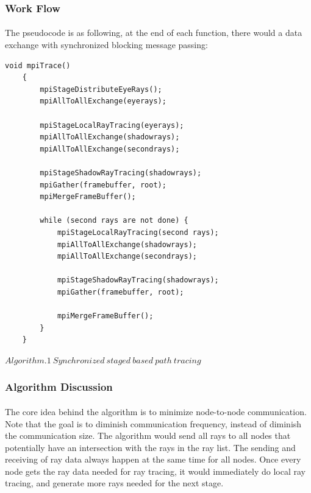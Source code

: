 \documentclass[a4paper, oneside, 10pt]{article}
\begin{document}
\subsubsection{Work Flow}
\paragraph{}The pseudocode is as following, at the end of each function, there would a data exchange with synchronized blocking message passing:
\lstset{language=c++}
\begin{lstlisting}[frame=single]
    void mpiTrace()
    {
        mpiStageDistributeEyeRays();
        mpiAllToAllExchange(eyerays);
        
        mpiStageLocalRayTracing(eyerays);
        mpiAllToAllExchange(shadowrays);
        mpiAllToAllExchange(secondrays);
        
        mpiStageShadowRayTracing(shadowrays);
        mpiGather(framebuffer, root);
       	mpiMergeFrameBuffer();
        
        while (second rays are not done) {
            mpiStageLocalRayTracing(second rays);
            mpiAllToAllExchange(shadowrays);
            mpiAllToAllExchange(secondrays);
            
            mpiStageShadowRayTracing(shadowrays);
            mpiGather(framebuffer, root);
            
            mpiMergeFrameBuffer();
        }
    }
\end{lstlisting}
$Algorithm. 1\ Synchronized\ staged\ based\ path\ tracing$
\subsubsection{Algorithm Discussion}
\paragraph{} The core idea behind the algorithm is to minimize node-to-node communication. Note that the goal is to diminish communication frequency, instead of diminish the communication size. The algorithm would send all rays to all nodes that potentially have an intersection with the rays in the ray list. The sending and receiving of ray data always happen at the same time for all nodes. Once every node gets the ray data needed for ray tracing, it would immediately do local ray tracing, and generate more rays needed for the next stage. 
\end{document}
